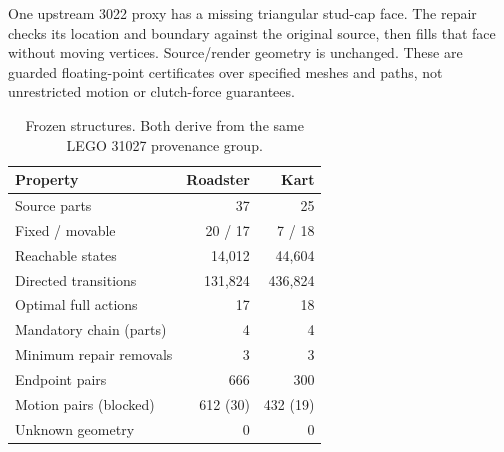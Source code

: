 \documentclass[10pt,twocolumn]{article}
\begin{document}
One upstream 3022 proxy has a missing triangular stud-cap face. The repair checks
its location and boundary against the original source, then fills that face
without moving vertices. Source/render geometry is unchanged. These are guarded
floating-point certificates over specified meshes and paths, not unrestricted
motion or clutch-force guarantees.

\begin{table}[t]
\centering\small
\caption{Frozen structures. Both derive from the same LEGO 31027 provenance group.}
\begin{tabular}{lrr}
\toprule
Property & Roadster & Kart\\
\midrule
Source parts & 37 & 25\\
Fixed / movable & 20 / 17 & 7 / 18\\
Reachable states & 14,012 & 44,604\\
Directed transitions & 131,824 & 436,824\\
Optimal full actions & 17 & 18\\
Mandatory chain (parts) & 4 & 4\\
Minimum repair removals & 3 & 3\\
Endpoint pairs & 666 & 300\\
Motion pairs (blocked) & 612 (30) & 432 (19)\\
Unknown geometry & 0 & 0\\
\bottomrule
\end{tabular}
\label{tab:cases}
\end{table}
\end{document}
